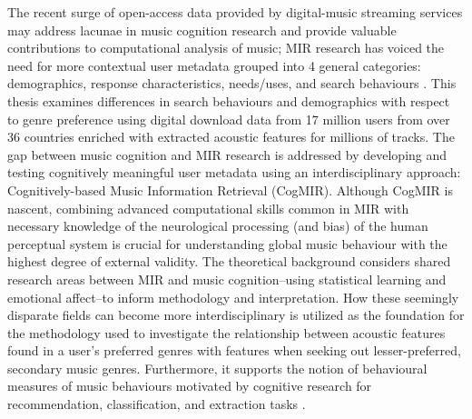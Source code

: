 \documentclass[a4paper]{article}
\begin{document}
The recent surge of open-access data provided by digital-music streaming services may address lacunae in music cognition research and provide valuable contributions to computational analysis of music; MIR research has voiced the need for more contextual user metadata grouped into 4 general categories: demographics, response characteristics, needs/uses, and search behaviours \cite{lee2004survey}. This thesis examines differences in search behaviours and demographics with respect to genre preference using digital download data from 17 million users from over 36 countries enriched with extracted acoustic features for millions of tracks. The gap between music cognition and MIR research is addressed by developing and testing cognitively meaningful user metadata using an interdisciplinary approach: Cognitively-based Music Information Retrieval (CogMIR). Although CogMIR is nascent, combining advanced computational skills common in MIR with necessary knowledge of the neurological processing (and bias) of the human perceptual system is crucial for understanding global music behaviour with the highest degree of external validity. The theoretical background considers shared research areas between MIR and music cognition--using statistical learning and emotional affect--to inform methodology and interpretation. How these seemingly disparate fields can become more interdisciplinary is utilized as the foundation for the methodology used to investigate the relationship between acoustic features found in a user's preferred genres with features when seeking out lesser-preferred, secondary music genres. Furthermore, it supports the notion of behavioural measures of music behaviours motivated by cognitive research for recommendation, classification, and extraction tasks \cite{friberg2014using}.
\end{document}

